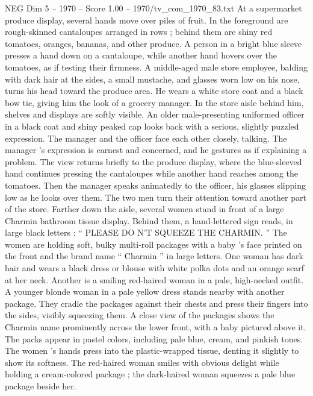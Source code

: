 \begin{textsample}{NEG Dim 5 – 1970 – Score 1.00 – 1970/tv\_com\_1970\_83.txt}  \label{ex:f5_neg_018}
At a supermarket produce display, several hands move over piles of fruit.
In the foreground are rough-skinned cantaloupes arranged in rows ; behind them are shiny red tomatoes, oranges, bananas, and other produce.
A person in a bright blue sleeve presses a hand down on a cantaloupe, while another hand hovers over the tomatoes, as if testing their firmness.
A middle-aged male store employee, balding with dark hair at the sides, a small mustache, and glasses worn low on his nose, turns his head toward the produce area.
He wears a white store coat and a black bow tie, giving him the look of a grocery manager.
In the store aisle behind him, shelves and displays are softly visible.
An older male-presenting uniformed officer in a black coat and shiny peaked cap looks back with a serious, slightly puzzled expression.
The manager and the officer face each other closely, talking.
The manager ’s expression is earnest and concerned, and he gestures as if explaining a problem.
The view returns briefly to the produce display, where the blue-sleeved hand continues pressing the cantaloupes while another hand reaches among the tomatoes.
Then the manager speaks animatedly to the officer, his glasses slipping low as he looks over them.
The two men turn their attention toward another part of the store.
Farther down the aisle, several women stand in front of a large Charmin bathroom tissue display.
Behind them, a hand-lettered sign reads, in large black letters : “ PLEASE DO N’T SQUEEZE THE CHARMIN. ” The women are holding soft, bulky multi-roll packages with a baby ’s face printed on the front and the brand name “ Charmin ” in large letters.
One woman has dark hair and wears a black dress or blouse with white polka dots and an orange scarf at her neck.
Another is a smiling red-haired woman in a pale, high-necked outfit.
A younger blonde woman in a pale yellow dress stands nearby with another package.
They cradle the packages against their chests and press their fingers into the sides, visibly squeezing them.
A close view of the packages shows the Charmin name prominently across the lower front, with a baby pictured above it.
The packs appear in pastel colors, including pale blue, cream, and pinkish tones.
The women ’s hands press into the plastic-wrapped tissue, denting it slightly to show its softness.
The red-haired woman smiles with obvious delight while holding a cream-colored package ; the dark-haired woman squeezes a pale blue package beside her.

\end{textsample}
